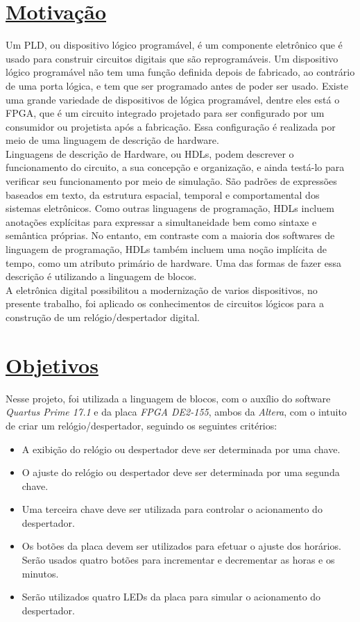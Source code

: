\documentclass[14pt, oneside]{book}
\newcommand\tab[1][1cm]{\hspace*{#1}}
\theoremstyle{definition}
\begin{document}
        \chapter[Motivação]{\hyperlink{toc}{Motivação}}
            \tab Um PLD, ou dispositivo lógico programável, é um componente eletrônico que é usado para construir circuitos digitais que são reprogramáveis. Um dispositivo lógico programável não tem uma função definida depois de fabricado, ao contrário de uma porta lógica, e tem que ser programado antes de poder ser usado. Existe uma grande variedade de dispositivos de lógica programável, dentre eles está o FPGA, que é um circuito integrado projetado para ser configurado por um consumidor ou projetista após a fabricação. Essa configuração é realizada por meio de uma linguagem de descrição de hardware. \\
	        \tab Linguagens de descrição de Hardware, ou HDLs, podem descrever o funcionamento do circuito, a sua concepção e organização, e ainda testá-lo para verificar seu funcionamento por meio de simulação. São padrões de expressões baseados em texto, da estrutura espacial, temporal e comportamental dos sistemas eletrônicos. Como outras linguagens de programação, HDLs incluem anotações explícitas para expressar a simultaneidade bem como sintaxe e semântica próprias. No entanto, em contraste com a maioria dos softwares de linguagem de programação, HDLs também incluem uma noção implícita de tempo, como um atributo primário de hardware. Uma das formas de fazer essa descrição é utilizando a linguagem de blocos. \\
	        \tab A eletrônica digital possibilitou a modernização de varios dispositivos, no presente trabalho, foi aplicado os conhecimentos de circuitos lógicos para a construção de um relógio/despertador digital.
           
            
        \chapter[Objetivos]{\hypertarget{obj}{}\hyperlink{toc}{Objetivos}}
             \tab Nesse projeto, foi utilizada a linguagem de blocos, com o auxílio do software \textit{Quartus Prime 17.1} e da placa \textit{FPGA DE2-155}, ambos da \textit{Altera}, com o intuito de criar um relógio/despertador, seguindo os seguintes critérios:
            \begin{itemize}
                \item A exibição do relógio ou despertador deve ser determinada por uma chave.
                \item O ajuste do relógio ou despertador deve ser determinada por uma segunda chave.
                \item Uma terceira chave deve ser utilizada para controlar o acionamento do despertador.
                \item Os botões da placa devem ser utilizados para efetuar o ajuste dos horários. Serão usados quatro botões para incrementar e decrementar as horas e os minutos.
                \item Serão utilizados quatro LEDs da placa para simular o acionamento do despertador.
            \end{itemize}
\end{document}
